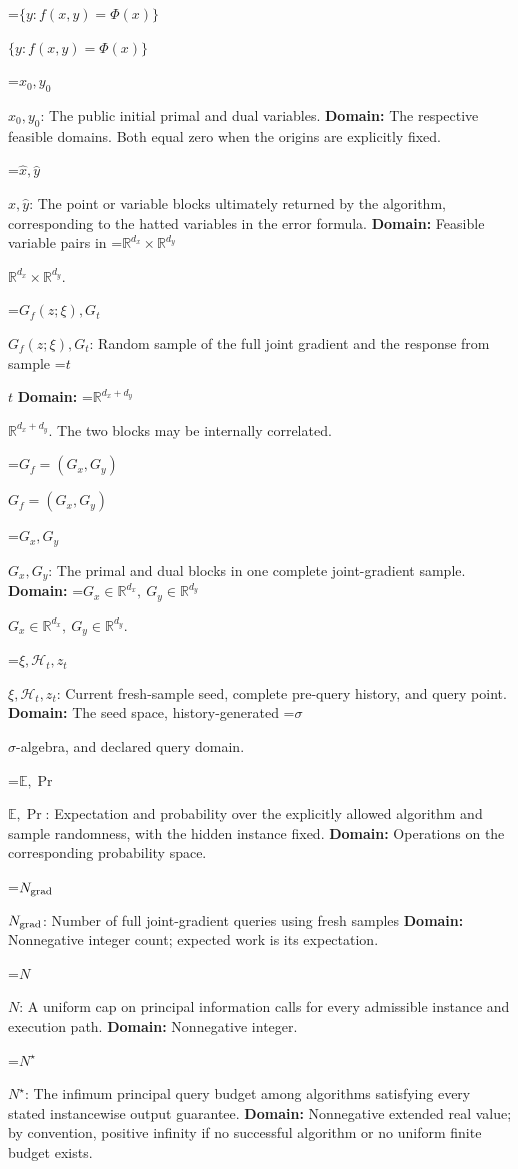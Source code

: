 \documentclass[10pt,a4paper]{article}
\newcommand{\AtlasMath}[1]{\par\begingroup\centering\setbox0=\hbox{$\displaystyle #1$}\ifdim\wd0>1.4\linewidth\typeout{ATLAS WIDE FORMULA: \the\wd0}\fi\ifdim\wd0>\linewidth\resizebox{\linewidth}{!}{\box0}\else\box0\fi\par\endgroup}
\newcommand{\AtlasInlineMath}[1]{\begingroup\setbox0=\hbox{$#1$}\ifdim\wd0>.4\linewidth\endgroup\AtlasMath{#1}\else\endgroup$#1$\fi}
\begin{document}
\AtlasInlineMath{\{y:f(x,y)=\Phi(x)\}}



\AtlasInlineMath{x_0,y_0}: The public initial primal and dual variables. \textbf{Domain:} The respective feasible domains. Both equal zero when the origins are explicitly fixed.



\AtlasInlineMath{\widehat x,\widehat y}: The point or variable blocks ultimately returned by the algorithm, corresponding to the hatted variables in the error formula. \textbf{Domain:} Feasible variable pairs in \AtlasInlineMath{\mathbb R^{d_x}\times\mathbb R^{d_y}}.



\AtlasInlineMath{G_f(z;\xi),G_t}: Random sample of the full joint gradient and the response from sample \AtlasInlineMath{t} \textbf{Domain:} \AtlasInlineMath{\mathbb R^{d_x+d_y}}. The two blocks may be internally correlated.



\AtlasInlineMath{G_f=(G_x,G_y)}



\AtlasInlineMath{G_x,G_y}: The primal and dual blocks in one complete joint-gradient sample. \textbf{Domain:} \AtlasInlineMath{G_x\in\mathbb R^{d_x},\ G_y\in\mathbb R^{d_y}}.



\AtlasInlineMath{\xi,\mathcal H_t,z_t}: Current fresh-sample seed, complete pre-query history, and query point. \textbf{Domain:} The seed space, history-generated \AtlasInlineMath{\sigma}-algebra, and declared query domain.



\AtlasInlineMath{\mathbb E,\Pr}: Expectation and probability over the explicitly allowed algorithm and sample randomness, with the hidden instance fixed. \textbf{Domain:} Operations on the corresponding probability space.



\AtlasInlineMath{N_{\rm grad}}: Number of full joint-gradient queries using fresh samples \textbf{Domain:} Nonnegative integer count; expected work is its expectation.



\AtlasInlineMath{N}: A uniform cap on principal information calls for every admissible instance and execution path. \textbf{Domain:} Nonnegative integer.



\AtlasInlineMath{N^\star}: The infimum principal query budget among algorithms satisfying every stated instancewise output guarantee. \textbf{Domain:} Nonnegative extended real value; by convention, positive infinity if no successful algorithm or no uniform finite budget exists.
\end{document}
